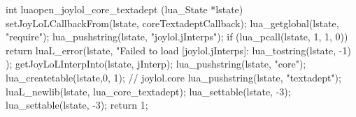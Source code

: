 int luaopen_joylol_core_textadept (lua_State *lstate) {
  setJoyLoLCallbackFrom(lstate, coreTextadeptCallback);
  lua_getglobal(lstate, "require");
  lua_pushstring(lstate, "joylol.jInterps");
  if (lua_pcall(lstate, 1, 1, 0)) {
    return luaL_error(lstate,
      "Failed to load [joylol.jInterps]\nERROR:\n%
      lua_tostring(lstate, -1)
    );
  }
  getJoyLoLInterpInto(lstate, jInterp);
  lua_pushstring(lstate, "core");
  lua_createtable(lstate,0, 1); // joylol.core 
  lua_pushstring(lstate, "textadept");
  luaL_newlib(lstate, lua_core_textadept);
  lua_settable(lstate, -3);
  lua_settable(lstate, -3);
  return 1;
}
\stopCCode